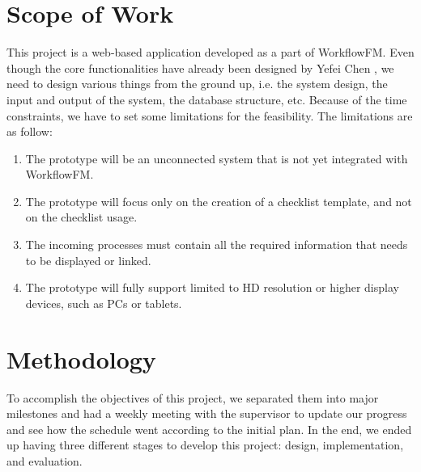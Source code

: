 \section{Scope of Work}
\label{intro:scope_of_work}

This project is a web-based application developed as a part of WorkflowFM. Even though the core functionalities have already been designed by Yefei Chen \cite{checklistdesign}, we need to design various things from the ground up, i.e. the system design, the input and output of the system, the database structure, etc. Because of the time constraints, we have to set some limitations for the feasibility. The limitations are as follow:



\begin{enumerate}
    \item The prototype will be an unconnected system that is not yet integrated with WorkflowFM.
    \item The prototype will focus only on the creation of a checklist template, and not on the checklist usage.
    \item The incoming processes must contain all the required information that needs to be displayed or linked.
    \item The prototype will fully support limited to HD resolution or higher display devices, such as PCs or tablets.
\end{enumerate}

\section{Methodology}
To accomplish the objectives of this project, we separated them into major milestones and had a weekly meeting with the supervisor to update our progress and see how the schedule went according to the initial plan. In the end, we ended up having three different stages to develop this project: design, implementation, and evaluation.

